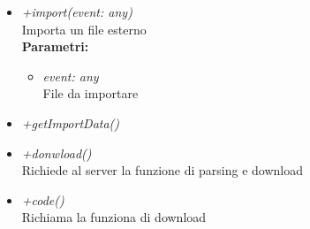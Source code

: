 \begin{itemize}
\begin{itemize}
\begin{itemize}
    		\end{itemize}
    		\item \emph{+import(event: any)}\\
    		Importa un file esterno\\
    		\textbf{Parametri:}
    		\begin{itemize}
    			\item \emph{event: any}\\
    			File da importare
    		\end{itemize}
    		\item \emph{+getImportData()}\\
    		
    		\item \emph{+donwload()}\\
    		Richiede al server la funzione di parsing e download
    		\item \emph{+code()}\\
    		Richiama la funziona di download
		\end{itemize}
\end{itemize}